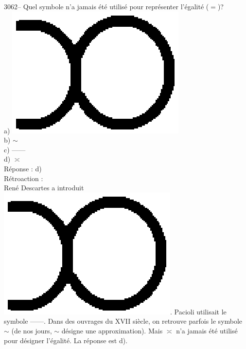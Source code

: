 \documentclass[letterpaper, 12pt]{article}
\begin{document}
3062-- Quel symbole n'a jamais \'et\'e utilis\'e pour repr\'esenter l'\'egalit\'e ($=$)?\\

a) \includegraphics[scale=0.09]{egaliteDescartes.eps}\\
b) $\sim$\\
c) ------\\
d) $\asymp$\\

R\'eponse : d)\\

R\'etroaction :\\
Ren\'e Descartes a introduit \includegraphics[scale=0.09]{egaliteDescartes.eps}. Pacioli utilisait le symbole ------. Dans des ouvrages du {\scriptsize XVII\ieme{}} si\`ecle, on retrouve parfois le symbole $\sim$ (de nos jours, $\sim$ d\'esigne une approximation). Mais $\asymp$ n'a jamais \'et\'e utilis\'e pour d\'esigner l'\'egalit\'e. La r\'eponse est d).\\
\end{document}
